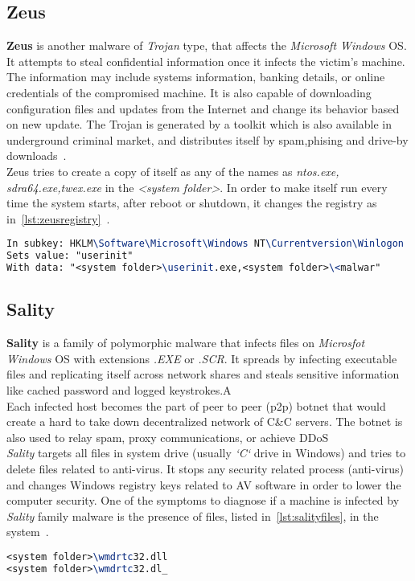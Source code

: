 \subsection{Zeus}
\label{sub:Zeus}
\textbf{Zeus} is another malware of \emph{Trojan} type, that affects the \emph{Microsoft Windows} OS\@.
It attempts to steal confidential information once it infects the victim's machine.
The information may include systems information, banking details, or online credentials of the compromised machine.
It is also capable of downloading configuration files and updates from the Internet and change its behavior based on new update.
The Trojan is generated by a toolkit which is also available in underground criminal market, and distributes itself by spam,phising and drive-by downloads~\cite[Trojan.Zbot]{zeus}.\\
Zeus tries to create a copy of itself as any of the names as \emph{ntos.exe, sdra64.exe,twex.exe} in the \textit{<system folder>}.
In order to make itself run every time the system starts, after reboot or shutdown, it changes the registry as in~\autoref{lst:zeusregistry}~\cite[Win32/Zbot]{zeusmicro}.
\begin{lstlisting}[language=TeX,caption={Registry key modified by Zeus Trojan to autostart},label={lst:zeusregistry}]
In subkey: HKLM\Software\Microsoft\Windows NT\Currentversion\Winlogon
Sets value: "userinit"
With data: "<system folder>\userinit.exe,<system folder>\<malwar"
\end{lstlisting}
\subsection{Sality}
\label{sub:Sality}
\textbf{Sality} is a family of polymorphic malware that infects files on \emph{Microsfot Windows} OS with extensions \emph{.EXE} or \emph{.SCR}.
It spreads by infecting executable files and replicating itself across network shares and steals sensitive information like cached password and logged keystrokes.A\\
Each infected host becomes the part of peer to peer (p2p) botnet that would create a hard to take down decentralized network of C\&C servers.
The botnet is also used to relay spam, proxy communications, or achieve DDoS~\cite[Sality]{salitysym}\\
\emph{Sality} targets all files in system drive (usually \emph{`C`} drive in Windows) and tries to delete files related to anti-virus.
It stops any security related process (anti-virus) and changes Windows registry keys related to AV software in order to lower the computer security.
One of the symptoms to diagnose if a machine is infected by \emph{Sality} family malware is the presence of files, listed in~\autoref{lst:salityfiles}, in the system~\cite[Win32/Sality]{salitymicro}.
\begin{lstlisting}[language=TeX,caption={Files created by Sality in the infected machine},label={lst:salityfiles}]
<system folder>\wmdrtc32.dll
<system folder>\wmdrtc32.dl_
\end{lstlisting}
